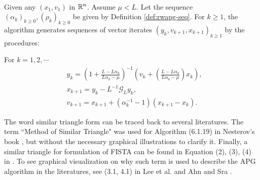 \documentclass[12pt]{article}
\begin{document}
        \begin{definition}\label{def:r-wapg-st-form} \; \\
            Given any $(x_1, v_1)$ in $\mathbb R^n$. 
            Assume $\mu < L$.
            Let the sequence $(\alpha_k)_{k \ge 0}, (\rho_k)_{k\ge 0}$ be given by Definition \ref{def:rwapg-seq}. 
            For $k \ge 1$, the algorithm generates sequences of vector iterates $(y_k, v_{k + 1}, x_{k + 1})_{k \ge 1}$ by the procedures: 
            \begin{tcolorbox}
                For $k=1, 2, \cdots $
                \begin{align*}
                    & y_k = 
                    \left(
                        1 + \frac{L - L\alpha_k}{L\alpha_k - \mu}
                    \right)^{-1}
                    \left(
                        v_k + 
                        \left(\frac{L - L\alpha_k}{L\alpha_k - \mu} \right) x_k
                    \right), 
                    \\
                    & x_{k + 1} = 
                    y_k - L^{-1} \mathcal G_L y_k, 
                    \\
                    & v_{k + 1} = 
                    x_{k + 1} + (\alpha_k^{-1} -1)(x_{k + 1} - x_k). 
                \end{align*}    
            \end{tcolorbox}
        \end{definition}
        \begin{remark}
            The word similar triangle form can be traced back to several literatures. 
            The term ``Method of Similar Triangle" was used for Algorithm (6.1.19) in Nesterov's book \cite{nesterov_lectures_2018}, but without the necessary graphical illustrations to clarify it. 
            Finally, a similar triangle for formulation of FISTA can be found in Equation (2), (3), (4) in 
            \cite{chambolle_convergence_2015}. 
            To see graphical visualization on why such term is used to describe the APG algorithm in the literatures, see 
            {(3.1, 4.1) in Lee et al. \cite{lee_geometric_2021} and Ahn and Sra \cite{ahn_understanding_2022}}. 
        \end{remark}
\end{document}
